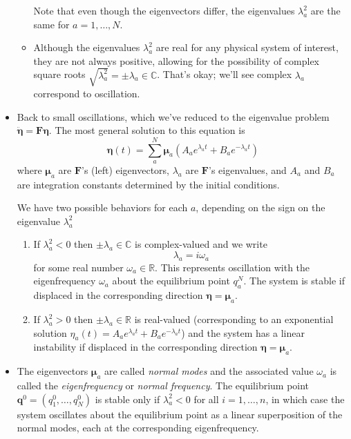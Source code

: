 \documentclass[11pt, a4paper]{article}
\newcommand{\R}{\mathbb{R}} %
\newcommand{\mat}[1]{\mathbf{#1}}
\begin{document}
\begin{itemize}
\begin{itemize}
		Note that even though the eigenvectors differ, the eigenvalues $ \lambda_{a}^{2} $ are the same for $ a = 1, \ldots, N $.
		
		\item Although the eigenvalues $ \lambda_{a}^{2} $ are real for any physical system of interest, they are not always positive, allowing for the possibility of complex square roots $ \sqrt{\lambda_{a}^{2}} = \pm \lambda_{a} \in \mathbb{C} $. That's okay; we'll see complex $  \lambda_{a}  $ correspond to oscillation.

	\end{itemize}

	\item Back to small oscillations, which we've reduced to the eigenvalue problem $ \ddot{\bm{\eta}} = \mathbf{F} \bm{\eta} $. The most general solution to this equation is
	\begin{equation*}
		\bm{\eta}(t) = \sum_{a}^{N} \bm{\mu}_{a} \left(A_a e^{\lambda_a t} + B_a e^{ -\lambda_a t} \right)
	\end{equation*}
	where $ \bm{\mu}_{a} $ are $ \mat{F} $'s (left) eigenvectors, $ \lambda_{a} $  are $ \mat{F} $'s eigenvalues, and $ A_a $ and $ B_a $ are integration constants determined by the initial conditions. 
	
	We have two possible behaviors for each $ a $, depending on the sign on the eigenvalue $ \lambda_{a}^{2} $
	\begin{enumerate}
		\item If $ \lambda_a^2 < 0 $ then $ \pm \lambda_a \in \mathbb{C} $ is complex-valued and we write 
		\begin{equation*}
			\lambda_a = i \omega_a
		\end{equation*}
		for some real number $ \omega_a \in \R $. This represents oscillation with the eigenfrequency $ \omega_a $ about the equilibrium point $ q_{a}^{N} $. The system is stable if displaced in the corresponding direction $ \bm{\eta} = \bm{\mu}_a $.
		
		\item If $ \lambda_a^2 > 0 $ then $ \pm \lambda_a \in \R $ is real-valued (corresponding to an exponential solution $ \eta_{a}(t) = A_{a} e^{\lambda_{a} t} +  B_{a} e^{- \lambda_{a} t} $)  and the system has a linear instability if displaced in the corresponding direction $ \bm{\eta} = \bm{\mu}_a $.
	\end{enumerate}
	
	\item The eigenvectors $ \bm{\mu}_{a} $ are called \textit{normal modes} and the associated value $ \omega_{a} $ is called the \textit{eigenfrequency} or \textit{normal frequency}. The equilibrium point $ \bm{q}^{0} = (q_{1}^{0}, \ldots, q_{N}^{0}) $ is stable only if $ \lambda_{a}^{2} < 0 $ for all $ i = 1, \dots, n $, in which case the system oscillates about the equilibrium point as a linear superposition of the normal modes, each at the corresponding eigenfrequency.
	

\end{itemize}
\end{document}
